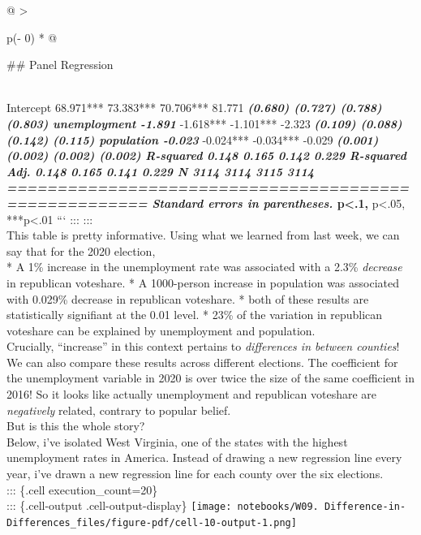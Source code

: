 \documentclass[
  letterpaper,
  DIV=11,
  numbers=noendperiod]{scrreprt}
\begin{document}
\begin{longtable}[]{@{}
  >{\raggedright\arraybackslash}p{(\columnwidth - 0\tabcolsep) * }@{}}
\toprule\noalign{}
\begin{minipage}[b]{\linewidth}\raggedright
\#\# Panel Regression
\end{minipage} \\
\midrule\noalign{}
\endhead
\bottomrule\noalign{}
\endlastfoot
Intercept 68.971*** 73.383*** 70.706*** 81.771\textbf{\emph{ (0.680)
(0.727) (0.788) (0.803) unemployment -1.891}} -1.618*** -1.101***
-2.323\textbf{\emph{ (0.109) (0.088) (0.142) (0.115) population -0.023}}
-0.024*** -0.034*** -0.029\textbf{\emph{ (0.001) (0.002) (0.002) (0.002)
R-squared 0.148 0.165 0.142 0.229 R-squared Adj. 0.148 0.165 0.141 0.229
N 3114 3114 3115 3114
====================================================== Standard errors
in parentheses. } p\textless.1, } p\textless.05, ***p\textless.01 ```
::: ::: \\
This table is pretty informative. Using what we learned from last week,
we can say that for the 2020 election, \\
* A 1\% increase in the unemployment rate was associated with a 2.3\%
\emph{decrease} in republican voteshare. * A 1000-person increase in
population was associated with 0.029\% decrease in republican voteshare.
* both of these results are statistically signifiant at the 0.01 level.
* 23\% of the variation in republican voteshare can be explained by
unemployment and population. \\
Crucially, ``increase'' in this context pertains to \emph{differences in
between counties}! \\
We can also compare these results across different elections. The
coefficient for the unemployment variable in 2020 is over twice the size
of the same coefficient in 2016! So it looks like actually unemployment
and republican voteshare are \emph{negatively} related, contrary to
popular belief. \\
But is this the whole story? \\
Below, i've isolated West Virginia, one of the states with the highest
unemployment rates in America. Instead of drawing a new regression line
every year, i've drawn a new regression line for each county over the
six elections. \\
::: \{.cell execution\_count=20\} \\
::: \{.cell-output .cell-output-display\}
\texttt{[image: notebooks/W09. Difference-in-Differences\_files/figure-pdf/cell-10-output-1.png]}

\end{longtable}
\end{document}
